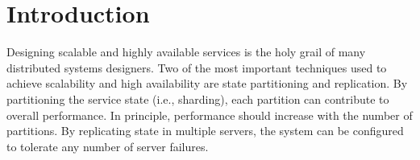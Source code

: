 \section{Introduction}

Designing scalable and highly available services is the holy grail of many distributed systems designers.
Two of the most important techniques used to achieve scalability and high availability are state partitioning and replication.
By partitioning the service state (i.e., sharding), each partition can contribute to overall performance.
In principle, performance should increase with the number of partitions.
By replicating state in multiple servers, the system can be configured to tolerate any number of server failures.

